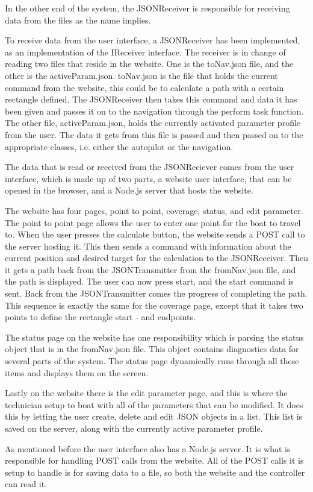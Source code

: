 In the other end of the system, the JSONReceiver is responsible for receiving data from the files as the name implies.

To receive data from the user interface, a JSONReceiver has been implemented, as an implementation of the IReceiver interface. The receiver is in change of reading two files that reside in the website. One is the toNav.json file, and the other is the activeParam.json. toNav.json is the file that holds the current command from the website, this could be to calculate a path with a certain rectangle defined. The JSONReceiver then takes this command and data it has been given and passes it on to the navigation through the perform task function. The other file, activeParam.json, holds the currently activated parameter profile from the user. The data it gets from this file is passed and then passed on to the appropriate classes, i.e. either the autopilot or the navigation.

The data that is read or received from the JSONReciever comes from the user interface, which is made up of two parts, a website user interface, that can be opened in the browser, and a Node.js server that hosts the website. 

The website has four pages, point to point, coverage, status, and edit parameter. The point to point page allows the user to enter one point for the boat to travel to. When the user presses the calculate button, the website sends a POST call to the server hosting it. This then sends a command with information about the current position and desired target for the calculation to the JSONReceiver. Then it gets a path back from the JSONTransmitter from the fromNav.json file, and the path is displayed. The user can now press start, and the start command is sent. Back from the JSONTransmitter comes the progress of completing the path. This sequence is exactly the same for the coverage page, except that it takes two points to define the rectangle start - and endpoints. 

The status page on the website has one responsibility which is parsing the status object that is in the fromNav.json file. This object contains diagnostics data for several parts of the system. The status page dynamically runs through all these items and displays them on the screen.

Lastly on the website there is the edit parameter page, and this is where the technician setup to boat with all of the parameters that can be modified. It does this by letting the user create, delete and edit JSON objects in a list. This list is saved on the server, along with the currently active parameter profile. 

As mentioned before the user interface also has a Node.js server\cite{nodejs}. It is what is responsible for handling POST calls from the website. All of the POST calls it is setup to handle is for saving data to a file, so both the website and the controller can read it.



